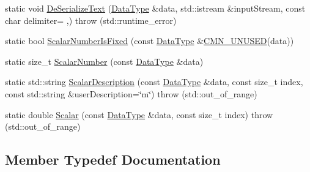 \begin{DoxyCompactItemize}
\item 
static void \hyperlink{classcmn_data_3_01vct_dynamic_matrix_3_01__element_type_01_4_01_4_a4a322e922936c7d8eaa20ed72aed2e3a}{De\+Serialize\+Text} (\hyperlink{classcmn_data_3_01vct_dynamic_matrix_3_01__element_type_01_4_01_4_aac077247ac3ce4c624c4636509abe930}{Data\+Type} \&data, std\+::istream \&input\+Stream, const char delimiter= \textquotesingle{},\textquotesingle{})  throw (std\+::runtime\+\_\+error)
\item 
static bool \hyperlink{classcmn_data_3_01vct_dynamic_matrix_3_01__element_type_01_4_01_4_a0266f9fecffbde87af0b78d740b368aa}{Scalar\+Number\+Is\+Fixed} (const \hyperlink{classcmn_data_3_01vct_dynamic_matrix_3_01__element_type_01_4_01_4_aac077247ac3ce4c624c4636509abe930}{Data\+Type} \&\hyperlink{cmn_portability_8h_a021894e2626935fa2305434b1e893ff6}{C\+M\+N\+\_\+\+U\+N\+U\+S\+E\+D}(data))
\item 
static size\+\_\+t \hyperlink{classcmn_data_3_01vct_dynamic_matrix_3_01__element_type_01_4_01_4_a2549babd27062a6ed15f9a6d62d74935}{Scalar\+Number} (const \hyperlink{classcmn_data_3_01vct_dynamic_matrix_3_01__element_type_01_4_01_4_aac077247ac3ce4c624c4636509abe930}{Data\+Type} \&data)
\item 
static std\+::string \hyperlink{classcmn_data_3_01vct_dynamic_matrix_3_01__element_type_01_4_01_4_afc289dfad0ed05e995c22f25458a621c}{Scalar\+Description} (const \hyperlink{classcmn_data_3_01vct_dynamic_matrix_3_01__element_type_01_4_01_4_aac077247ac3ce4c624c4636509abe930}{Data\+Type} \&data, const size\+\_\+t index, const std\+::string \&user\+Description=\char`\"{}m\char`\"{})  throw (std\+::out\+\_\+of\+\_\+range)
\item 
static double \hyperlink{classcmn_data_3_01vct_dynamic_matrix_3_01__element_type_01_4_01_4_a1305843fa6d12b863a1485427a59967c}{Scalar} (const \hyperlink{classcmn_data_3_01vct_dynamic_matrix_3_01__element_type_01_4_01_4_aac077247ac3ce4c624c4636509abe930}{Data\+Type} \&data, const size\+\_\+t index)  throw (std\+::out\+\_\+of\+\_\+range)
\end{DoxyCompactItemize}


\subsection{Member Typedef Documentation}
\hypertarget{classcmn_data_3_01vct_dynamic_matrix_3_01__element_type_01_4_01_4_aac077247ac3ce4c624c4636509abe930}{}
